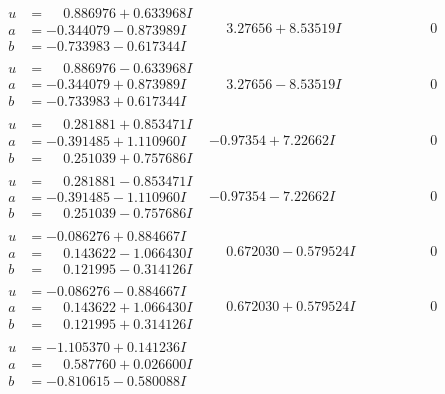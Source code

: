 \documentclass[1p]{elsarticle_modified}
\theoremstyle{definition}
\begin{document}
$$\begin{array}{c|c|c}
\begin{aligned}
u &= \phantom{-}0.886976 + 0.633968 I \\
a &= -0.344079 - 0.873989 I \\
b &= -0.733983 - 0.617344 I\end{aligned}
 & \phantom{-}3.27656 + 8.53519 I & \phantom{-0.000000 } 0 \\ \hline\begin{aligned}
u &= \phantom{-}0.886976 - 0.633968 I \\
a &= -0.344079 + 0.873989 I \\
b &= -0.733983 + 0.617344 I\end{aligned}
 & \phantom{-}3.27656 - 8.53519 I & \phantom{-0.000000 } 0 \\ \hline\begin{aligned}
u &= \phantom{-}0.281881 + 0.853471 I \\
a &= -0.391485 + 1.110960 I \\
b &= \phantom{-}0.251039 + 0.757686 I\end{aligned}
 & -0.97354 + 7.22662 I & \phantom{-0.000000 } 0 \\ \hline\begin{aligned}
u &= \phantom{-}0.281881 - 0.853471 I \\
a &= -0.391485 - 1.110960 I \\
b &= \phantom{-}0.251039 - 0.757686 I\end{aligned}
 & -0.97354 - 7.22662 I & \phantom{-0.000000 } 0 \\ \hline\begin{aligned}
u &= -0.086276 + 0.884667 I \\
a &= \phantom{-}0.143622 - 1.066430 I \\
b &= \phantom{-}0.121995 - 0.314126 I\end{aligned}
 & \phantom{-}0.672030 - 0.579524 I & \phantom{-0.000000 } 0 \\ \hline\begin{aligned}
u &= -0.086276 - 0.884667 I \\
a &= \phantom{-}0.143622 + 1.066430 I \\
b &= \phantom{-}0.121995 + 0.314126 I\end{aligned}
 & \phantom{-}0.672030 + 0.579524 I & \phantom{-0.000000 } 0 \\ \hline\begin{aligned}
u &= -1.105370 + 0.141236 I \\
a &= \phantom{-}0.587760 + 0.026600 I \\
b &= -0.810615 - 0.580088 I\end{aligned}

\end{array}$$
\end{document}
